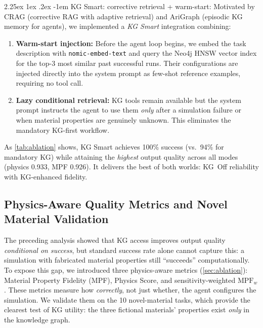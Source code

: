 \documentclass[preprint,review,12pt]{elsarticle}
\makeatletter
\renewcommand\paragraph{\@startsection{paragraph}{4}{\z@}%
  {2.25ex \@plus1ex \@minus.2ex}%
  {-1em}%
  {\normalfont\normalsize\bfseries}}
\makeatother
\begin{document}
\paragraph{KG Smart: corrective retrieval + warm-start:}
Motivated by CRAG \citep{yan2024crag} (corrective RAG with adaptive
retrieval) and AriGraph \citep{arigraph2024} (episodic KG memory for
agents), we implemented a \emph{KG Smart} integration combining:
\begin{enumerate}
  \item \textbf{Warm-start injection:} Before the agent loop begins, we embed
        the task description with \texttt{nomic-embed-text} and query the Neo4j
        HNSW vector index for the top-3 most similar past successful runs.
        Their configurations are injected directly into the system prompt as
        few-shot reference examples, requiring no tool call.
  \item \textbf{Lazy conditional retrieval:} KG tools remain available but the
        system prompt instructs the agent to use them \emph{only}
        after a simulation failure or when material properties are genuinely
        unknown.  This eliminates the mandatory KG-first workflow.
\end{enumerate}

As \cref{tab:ablation} shows, KG Smart achieves 100\% success
(vs.\ 94\% for mandatory KG) while attaining the \emph{highest} output
quality across all modes (physics 0.933, MPF 0.926).  It delivers the
best of both worlds: KG~Off reliability with KG-enhanced fidelity.

\subsection{Physics-Aware Quality Metrics and Novel Material Validation}
\label{sec:novidium}

The preceding analysis showed that KG access improves output quality
\emph{conditional on success}, but standard success rate alone cannot
capture this: a simulation with fabricated material properties still
``succeeds'' computationally.  To expose this gap, we introduced three
physics-aware metrics (\cref{sec:ablation}): Material Property Fidelity
(MPF), Physics Score, and sensitivity-weighted $\text{MPF}_w$.  These
metrics measure how \emph{correctly}, not just whether, the agent
configures the simulation.  We validate them on the 10 novel-material
tasks, which provide the clearest test of KG utility: the three
fictional materials' properties exist \emph{only} in the knowledge graph.
\end{document}
